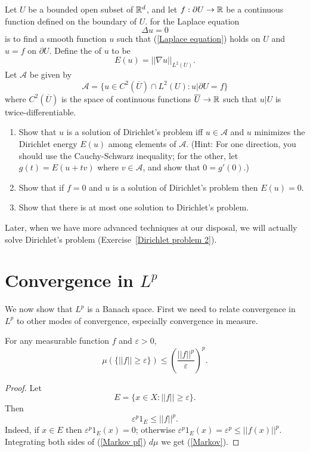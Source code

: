 \begin{exercise}
\label{Dirichlet problem}
Let $U$ be a bounded open subset of $\mathbb{R}^d$, and let $f: \partial U \to \mathbb{R}$ be a continuous function defined on the boundary of $U$.
 for the Laplace equation
\begin{equation}
\label{Laplace equation}
\Delta u = 0
\end{equation}
is to find a smooth function $u$ such that (\ref{Laplace equation}) holds on $U$ and $u = f$ on $\partial U$.
Define the  of $u$ to be
\[E(u) = ||\nabla u||_{L^2(U)}.\]
Let $\mathcal A$ be given by
\[\mathcal A = \{u \in C^2(\overline U) \cap L^2(U): u|\partial U = f\}\]
where $C^2(\overline U)$ is the space of continuous functions $\overline U \to \mathbb{R}$ such that $u|U$ is twice-differentiable.
\begin{enumerate}
\item Show that $u$ is a solution of Dirichlet's problem iff $u \in \mathcal A$ and $u$ minimizes the Dirichlet energy $E(u)$ among elements of $\mathcal A$.
(Hint: For one direction, you should use the Cauchy-Schwarz inequality; for the other, let $g(t) = E(u + tv)$ where $v \in \mathcal A$, and show that $0 = g'(0)$.)
\item Show that if $f = 0$ and $u$ is a solution of Dirichlet's problem then $E(u) = 0$.
\item Show that there is at most one solution to Dirichlet's problem.
\end{enumerate}
Later, when we have more advanced techniques at our disposal, we will actually solve Dirichlet's problem (Exercise~\ref{Dirichlet problem 2}).
\end{exercise}

\section{Convergence in $L^p$}
We now show that $L^p$ is a Banach space.
First we need to relate convergence in $L^p$ to other modes of convergence, especially convergence in measure.

\begin{theorem}
For any measurable function $f$ and $\varepsilon > 0$,
\begin{equation}
\label{Markov}
\mu(\{||f|| \geq \varepsilon\}) \leq \left(\frac{||f||^p}{\varepsilon}\right)^p.
\end{equation}
\end{theorem}
\begin{proof}
Let
\[E = \{x \in X: ||f|| \geq \varepsilon\}.\]
Then
\begin{equation}
\label{Markov pf}
\varepsilon^{p} 1_{E} \leq ||f||^p.
\end{equation}
Indeed, if $x \in E$ then $\varepsilon^{p} 1_E(x) = 0$; otherwise $\varepsilon^{p} 1_E(x) = \varepsilon^{p} \leq ||f(x)||^p$.
Integrating both sides of (\ref{Markov pf}) $d\mu$ we get (\ref{Markov}).
\end{proof}

